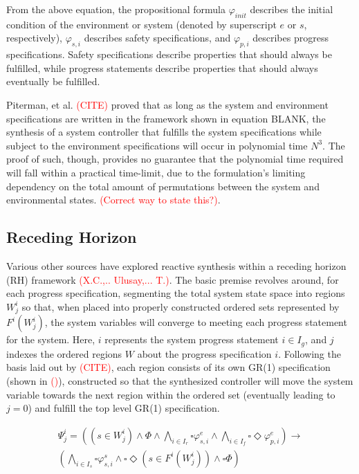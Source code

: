 \documentclass[journal]{IEEEtran}
\newcommand{\always}{\square}
\newcommand{\eventually}{\Diamond}
\begin{document}
From the above equation, the propositional formula $\varphi_{init}$  describes the initial condition of the environment or system (denoted by superscript $e$ or $s$, respectively), $\varphi_{s,i}$  describes safety specifications, and $\varphi_{p,i}$ describes progress specifications. Safety specifications describe properties that should always be fulfilled, while progress statements describe properties that should always eventually be fulfilled.

Piterman, et al. \textcolor{red}{(CITE)} proved that as long as the system and environment specifications are written in the framework shown in equation BLANK, the synthesis of a system controller that fulfills the system specifications while subject to the environment specifications will occur in polynomial time $N^3$. The proof of such, though, provides no guarantee that the polynomial time required will fall within a practical time-limit, due to the formulation’s limiting dependency on the total amount of permutations between the system and environmental states. \textcolor{red}{(Correct way to state this?)}.


\subsection{Receding Horizon}
Various other sources have explored reactive synthesis within a receding horizon (RH) framework \textcolor{red}{(X.C.,.. Ulusay,... T.)}. The basic premise revolves around, for each progress specification, segmenting the total system state space into regions $W_j^i$ so that, when placed into properly constructed ordered sets represented by $F^i(W_j^i)$, the system variables will converge to meeting each progress statement for the system. Here, $i$ represents the system progress statement $i \in I_g$, and $j$ indexes the ordered regions $W$ about the progress specification $i$. Following the basis laid out by \textcolor{red}{(CITE)}, each region consists of its own GR(1) specification (shown in \textcolor{red}{()}), constructed so that the synthesized controller will move the system variable towards the next region within the ordered set (eventually leading to $j = 0$) and fulfill the top level GR(1) specification.

\begin{equation}
\begin{aligned}
\Psi_{j}^{i} = ((s \in W_j^i) \land \Phi \land \bigwedge_{i \in I_r} \always \varphi_{s,i}^{e} \land \bigwedge_{i \in I_f} \always \eventually \varphi_{p,i}^{e}) \longrightarrow \\
(\bigwedge_{i \in I_s} \always \varphi_{s,i}^{s} \land \always \eventually(s \in F^i(W_j^i)) \land \always \Phi)
\end{aligned}
\end{equation}
\end{document}

